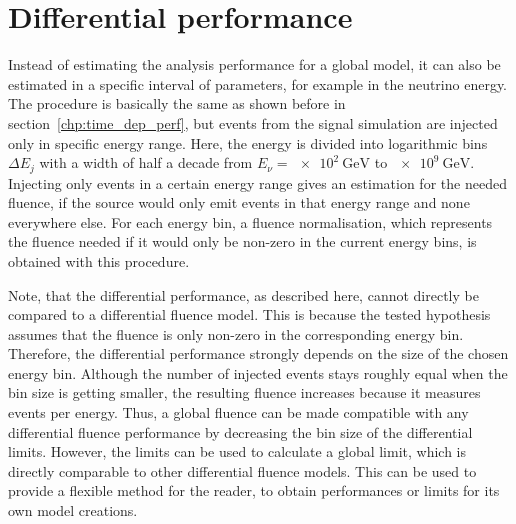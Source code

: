 \section{Differential performance}
  \label{chp:time_dep_diff_perf}
Instead of estimating the analysis performance for a global model, it can also be estimated in a specific interval of parameters, for example in the neutrino energy.
The procedure is basically the same as shown before in section~\ref{chp:time_dep_perf}, but events from the signal simulation are injected only in specific energy range.
Here, the energy is divided into logarithmic bins $\Delta E_j$ with a width of half a decade from $E_\nu = \SI{e2}{\GeV}$ to $\SI{e9}{\GeV}$.
Injecting only events in a certain energy range gives an estimation for the needed fluence, if the source would only emit events in that energy range and none everywhere else.
For each energy bin, a fluence normalisation, which represents the fluence needed if it would only be non-zero in the current energy bins, is obtained with this procedure.

Note, that the differential performance, as described here, cannot directly be compared to a differential fluence model.
This is because the tested hypothesis assumes that the fluence is only non-zero in the corresponding energy bin.
Therefore, the differential performance strongly depends on the size of the chosen energy bin.
Although the number of injected events stays roughly equal when the bin size is getting smaller, the resulting fluence increases because it measures events per energy.
Thus, a global fluence can be made compatible with any differential fluence performance by decreasing the bin size of the differential limits.
However, the limits can be used to calculate a global limit, which is directly comparable to other differential fluence models.
This can be used to provide a flexible method for the reader, to obtain performances or limits for its own model creations.

